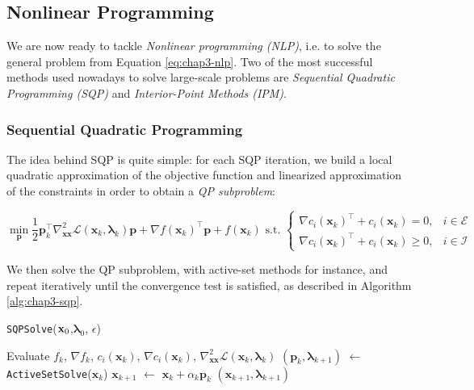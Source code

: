\subsection{Nonlinear Programming}

We are now ready to tackle \emph{Nonlinear programming (NLP)}, i.e. to
solve the general problem from Equation \ref{eq:chap3-nlp}. Two of the
most successful methods used nowadays to solve large-scale problems
are \emph{Sequential Quadratic Programming (SQP)} and
\emph{Interior-Point Methods (IPM)}.

\subsubsection{Sequential Quadratic Programming}
\label{subsubsec:chap3-sqp}

The idea behind SQP is quite simple: for each SQP iteration, we build
a local quadratic approximation of the objective function and
linearized approximation of the constraints in order to obtain a
\emph{QP subproblem}:

\begin{equation}
\min_{\mathbf{p}}\frac{1}{2}\mathbf{p}_k^{\top}\nabla_{\mathbf{x}\mathbf{x}}^2\mathcal{L}(\mathbf{x}_k,\boldsymbol{\lambda}_k)\mathbf{p}+\nabla f(\mathbf{x}_k)^{\top}\mathbf{p}+f(\mathbf{x}_k)
\text{ s.t. }
\left\{\begin{array}{cc}
\nabla c_i(\mathbf{x}_k)^{\top}+c_i(\mathbf{x}_k) = 0, & i \in \mathcal{E} \\
\nabla c_i(\mathbf{x}_k)^{\top}+c_i(\mathbf{x}_k) \ge 0, & i \in \mathcal{I}
\end{array}\right.
\end{equation}

We then solve the QP subproblem, with active-set methods for instance,
and repeat iteratively until the convergence test is satisfied, as
described in Algorithm \ref{alg:chap3-sqp}.

\begin{algorithm}
\caption{\texttt{SQPSolve}($\mathbf{x}_0$,$\boldsymbol{\lambda}_0$, $\epsilon$)}
\label{alg:chap3-sqp}
\begin{algorithmic}
\STATE Evaluate $f_k$, $\nabla f_k$, $c_i(\mathbf{x}_k)$, $\nabla c_i(\mathbf{x}_k)$, $\nabla_{\mathbf{x}\mathbf{x}}^2\mathcal{L}(\mathbf{x}_k,\boldsymbol{\lambda}_k)$
\STATE $(\mathbf{p}_k, \boldsymbol{\lambda}_{k+1})$ $\leftarrow$ \texttt{ActiveSetSolve}($\mathbf{x}_k$)
\STATE $\mathbf{x}_{k+1}$ $\leftarrow$ $\mathbf{x}_k + \alpha_k\mathbf{p}_k$
\RETURN $(\mathbf{x}_{k+1},\boldsymbol{\lambda}_{k+1})$
\ENDIF
\ENDFOR
\end{algorithmic}
\end{algorithm}

